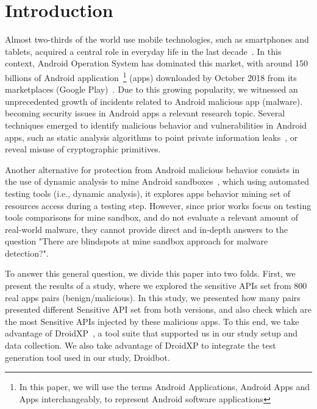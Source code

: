 \section{Introduction}\label{sec:introduction}

Almost two-thirds of the world use mobile technologies, such as smartphones and tablets, acquired a central role in everyday life in the last decade~\cite{Comscore}\cite{DBLP:journals/tse/MartinSJZH17}. In this context, Android Operation System has dominated this market, with around 150 billions of Android application~\footnote{In this paper, we will use the terms Android Applications, Android Apps and Apps interchangeably, to represent Android software applications} (apps) downloaded by October 2018 from its marketplaces (Google Play)~\cite{Statista}. Due to this growing popularity, we witnessed an unprecedented growth of incidents related to Android malicious app (malware).  becoming security issues in Android apps a relevant research topic. Several techniques emerged to identify malicious behavior and vulnerabilities in Android apps, such as static analysis algorithms to point private information leaks~\cite{DBLP:conf/pldi/ArztRFBBKTOM14}, or reveal misuse of 
cryptographic primitives.~\cite{DBLP:journals/tse/KrugerSABM21}

Another alternative for protection from Android malicious behavior consists in the use of dynamic analysis to mine Android sandboxes~\cite{DBLP:conf/icse/JamrozikSZ16}, which using automated testing tools (i.e., dynamic analysis), it explores apps behavior mining set of resources access during a testing step. However, since prior works focus on testing tools comparisons for mine sandbox, and do not evaluate a relevant amount of real-world malware, they cannot provide direct and in-depth answers to the question "There are blindspots at mine sandbox approach for malware detection?".

To answer this general question, we divide this paper into two folds. First, we present the results of a study, where we explored the sensitive APIs set from $800$ real apps pairs (benign/malicious). In this study, we presented how many pairs presented different Sensitive API set from both versions, and also check which are the most Sensitive APIs injected by these malicious apps. To this end, we take advantage of DroidXP~\cite{DBLP:conf/scam/CostaMCMVBC20}, a tool suite that supported us in our study setup and data collection. We also take advantage of DroidXP to integrate the test generation tool used in our study, Droidbot\cite{DBLP:conf/icse/LiYGC17}.

